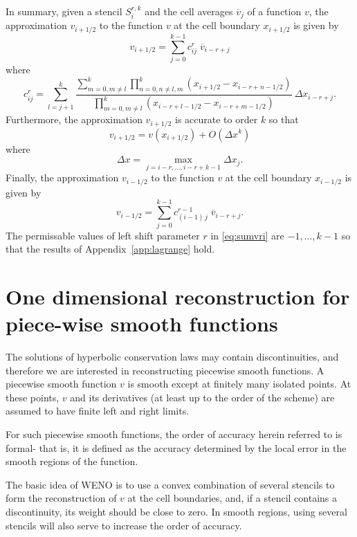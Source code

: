 \documentclass{article}
\newcommand{\xli}[0]{x_{i-1/2}}
\newcommand{\xri}[0]{x_{i+1/2}}
\newcommand{\vli}[0]{v_{i-1/2}}
\newcommand{\vri}[0]{v_{i+1/2}}
\numberwithin{equation}{section}
\begin{document}
In summary, given a stencil $S_i^{r,k}$ and the cell averages
$\overline{v}_j$ of a function $v$, the approximation $\vri$ to the
function $v$ at the cell boundary $\xri$ is given by
\begin{equation}
  \label{eq:sumvri}
  \vri = \sum_{j=0}^{k-1} c^r_{ij}\; \overline{v}_{i-r+j}
\end{equation}
where
\begin{equation}
  c^r_{ij} = \sum_{l=j+1}^k \frac{\sum_{m=0, m \neq l}^{k}
    \prod_{n=0, n \neq l,m}^{k} (\xri - x_{i-r+n-1/2})}{
    \prod_{m=0, m \neq l}^{k} (x_{i-r+l-1/2} - x_{i-r+m-1/2})}
    \ \Delta x_{i-r+j}.
\end{equation}
Furthermore, the approximation $\vri$ is accurate to order $k$ so that
\begin{equation*}
  \vri = v(\xri) + O(\Delta x^k)
\end{equation*}
where
\begin{equation*}
  \Delta x = \max_{j=i-r,\ldots,i-r+k-1} \Delta x_j.
\end{equation*}
Finally, the approximation $\vli$ to the function $v$ at the cell
boundary $\xli$ is given by
\begin{equation*}
  \vli = \sum_{j=0}^{k-1} c^{r-1}_{(i-1)\,j}\; \overline{v}_{i-r+j}.
\end{equation*}
The permissable values of left shift parameter $r$ in
\eqref{eq:sumvri} are $-1,\ldots,k-1$ so that the results of
Appendix~\ref{app:lagrange} hold.

\newpage
\section{One dimensional reconstruction for piece-wise smooth functions}

The solutions of hyperbolic conservation laws may contain
discontinuities, and therefore we are interested in reconstructing
piecewise smooth functions.  A piecewise smooth function $v$ is smooth
except at finitely many isolated points.  At these points, $v$ and its
derivatives (at least up to the order of the scheme) are assumed to
have finite left and right limits.

For such piecewise smooth functions, the order of accuracy herein
referred to is formal- that is, it is defined as the accuracy
determined by the local error in the smooth regions of the function.

The basic idea of WENO is to use a convex combination of several
stencils to form the reconstruction of $v$ at the cell boundaries,
and, if a stencil contains a discontinuity, its weight should be close
to zero.  In smooth regions, using several stencils will also serve to
increase the order of accuracy.
\end{document}
